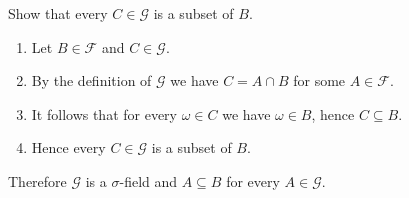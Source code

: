 \bigskip
\noindent
Show that every $C\in\mathcal G$ is a subset of $B$.
\begin{enumerate}
\item Let $B\in\mathcal F$ and $C\in\mathcal G$.
\item By the definition of $\mathcal G$ we have $C=A\cap B$ for some
$A\in\mathcal F$.
\item It follows that for every $\omega\in C$ we have $\omega\in B$,
hence $C\subseteq B$.
\item Hence every $C\in\mathcal G$ is a subset of $B$.
\end{enumerate}

\bigskip
\noindent
Therefore $\mathcal G$ is a $\sigma$-field and
$A\subseteq B$ for every $A\in\mathcal G$.
